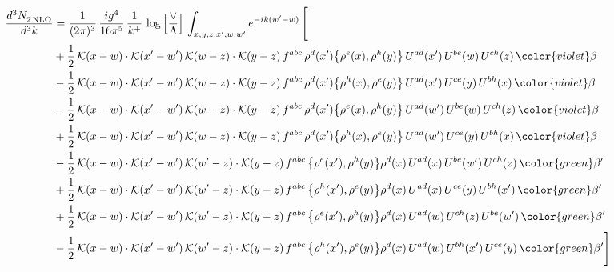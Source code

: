 \begin{align}
    \frac{d^{3}N_{2\,\rm NLO}^{\rm}}{d^{3}k}  & = \frac{1}{(2\pi)^{3}}\, \frac{ig^{4}}{16\pi^{5}}\, \frac{1}{k^{+}}\, \log{\left[\frac{\vee}{\Lambda}\right]}\, \int_{x,y,z,x^{\prime},w,w^{\prime}}e^{-ik(w^{\prime}-w)}\, \Bigg[\notag \\ & +\frac{1}{2}\,\mathcal{K}(x-w)\cdot\mathcal{K}(x'-w')\,\mathcal{K}(w-z)\cdot\mathcal{K}(y-z)\, f^{abc}\,\rho^{d}(x')\big\{\rho^{e}(x),\rho^{h}(y)\big\}\,U^{ad}(x')\,U^{be}(w)\,U^{ch}(z)\,{\color{violet} \beta}\notag\\ &-\frac{1}{2}\,\mathcal{K}(x-w)\cdot\mathcal{K}(x'-w')\,\mathcal{K}(w-z)\cdot\mathcal{K}(y-z)\, f^{abc}\,\rho^{d}(x')\big\{\rho^{h}(x),\rho^{e}(y)\big\}\,U^{ad}(x')\,U^{ce}(y)\,U^{bh}(x)\,{\color{violet} \beta}\notag\\ &-\frac{1}{2}\,\mathcal{K}(x-w)\cdot\mathcal{K}(x'-w')\,\mathcal{K}(w-z)\cdot\mathcal{K}(y-z)\, f^{abc}\,\rho^{d}(x')\big\{\rho^{e}(x),\rho^{h}(y)\big\}\,U^{ad}(w')\,U^{be}(w)\,U^{ch}(z)\,{\color{violet} \beta}\notag \\ &+\frac{1}{2}\,\mathcal{K}(x-w)\cdot\mathcal{K}(x'-w')\,\mathcal{K}(w-z)\cdot\mathcal{K}(y-z)\, f^{abc}\,\rho^{d}(x')\big\{\rho^{h}(x),\rho^{e}(y)\big\}\,U^{ad}(w')\,U^{ce}(y)\,U^{bh}(x)\,{\color{violet} \beta}\notag\\
&-\frac{1}{2}\,\mathcal{K}(x-w)\cdot\mathcal{K}(x'-w')\,\mathcal{K}(w'-z)\cdot\mathcal{K}(y-z)\, f^{abc}\,\big\{\rho^{e}(x'),\rho^{h}(y)\big\}\rho^{d}(x)\,U^{ad}(x)\,U^{be}(w')\,U^{ch}(z)\,{\color{green} \beta'}\notag \\ & +\frac{1}{2}\,\mathcal{K}(x-w)\cdot\mathcal{K}(x'-w')\,\mathcal{K}(w'-z)\cdot\mathcal{K}(y-z)\, f^{abc}\,\big\{\rho^{h}(x'),\rho^{e}(y)\big\}\rho^{d}(x)\,U^{ad}(x)\,U^{ce}(y)\,U^{bh}(x')\,{\color{green} \beta'} \notag\\ & +\frac{1}{2}\,\mathcal{K}(x-w)\cdot\mathcal{K}(x'-w')\,\mathcal{K}(w'-z)\cdot\mathcal{K}(y-z)\, f^{abc}\,\big\{\rho^{e}(x'),\rho^{h}(y)\big\}\rho^{d}(x)\,U^{ad}(w)\,U^{ch}(z)\,U^{be}(w')\,{\color{green} \beta'} \notag\\
& -\frac{1}{2}\,\mathcal{K}(x-w)\cdot\mathcal{K}(x'-w')\,\mathcal{K}(w'-z)\cdot\mathcal{K}(y-z)\, f^{abc}\,\big\{\rho^{h}(x'),\rho^{e}(y)\big\}\rho^{d}(x)\,U^{ad}(w)\,U^{bh}(x')\,U^{ce}(y)\,{\color{green} \beta'}\Bigg]
\end{align}
